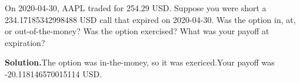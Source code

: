 \noindent On 2020-04-30, AAPL traded for 254.29 USD. Suppose you were short a 234.17185342998488 USD call that expired on 2020-04-30. Was the option in, at, or out-of-the-money? Was the option exercised? What was your payoff at expiration?

\vspace{9pt} 

\textbf{Solution.}The option was in-the-money, so it was exericed.Your payoff was -20.118146570015114 USD.